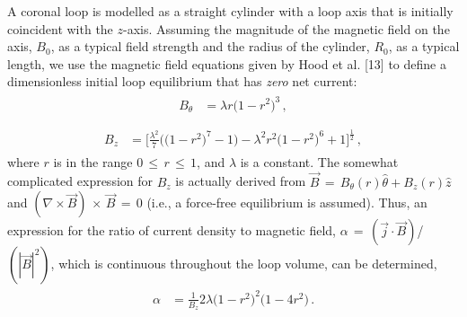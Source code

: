 \documentclass{./packages/rs/rsproca}
\begin{document}
A coronal loop is modelled as a straight cylinder with a loop axis that is initially coincident with the $z$-axis. Assuming the magnitude of the magnetic field on the axis, $B_0$, as a typical field strength and the radius of the cylinder, $R_0$, as a typical length, we use the magnetic field equations given by Hood et al. [13] to define a dimensionless initial loop equilibrium that has \textit{zero} net current:
\begin{align}\begin{split}
\label{eqn_btheta}
B_{\theta} &= \lambda r \Big(1 - r^2\Big)^{3}\,,\\
\end{split}\end{align}
\begin{align}\begin{split}
\label{eqn_bz}
B_{z} &= \Bigg[\frac{\lambda^2}{7}\Bigg(\Big(1-r^2\Big)^{7} - 1\Bigg) - \lambda^2 r^2 \Big(1-r^2\Big)^{6} + 1\Bigg]^{\frac{1}{2}}\,,
\end{split}\end{align}
where $r$ is in the range $0\,{\leq}\,r\,{\leq}\,1$, and $\lambda$ is a constant. The somewhat complicated expression for $B_z$ is actually derived from $\vec{B}\,{=}\,B_{\theta}(r)\hat{\theta} + B_z(r)\hat{z}$ and $(\nabla\times\vec{B})\,{\times}\,\vec{B}\,{=}\,0$ (i.e., a force-free equilibrium is assumed). Thus, an expression for the ratio of current density to magnetic field, $\alpha\,=\,(\vec{j}\cdot\vec{B})$/$(|\vec{B}|^{2})$, which is continuous throughout the loop volume, can be determined,
\begin{align}\begin{split}
\label{eqn_alpha}
\alpha &= \frac{1}{B_z} 2 \lambda \Big(1 - r^2\Big)^{2}\Big(1 - 4r^2\Big)\,.
\end{split}\end{align}
    
\end{document}
